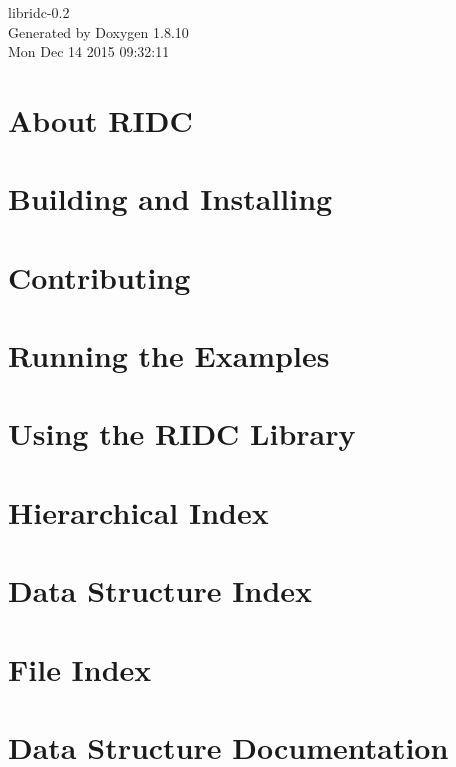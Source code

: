 \documentclass[twoside]{article}
\newcommand{\+}{\discretionary{\mbox{\scriptsize$\hookleftarrow$}}{}{}}
\begin{document}
\begin{titlepage}
\vspace*{7cm}
\begin{center}%
{\Large libridc-\/0.2 }\\
\vspace*{1cm}
{\large Generated by Doxygen 1.8.10}\\
\vspace*{0.5cm}
{\small Mon Dec 14 2015 09:32:11}\\
\end{center}
\end{titlepage}
\tableofcontents
{}

\section{About R\+I\+D\+C}
\label{md_README}

\section{Building and Installing}
\label{md_doc_source_0_installing}

\section{Contributing}
\label{page_contributing}

\section{Running the Examples}
\label{running}

\section{Using the R\+I\+D\+C Library}
\label{md_doc_source_3_use}

\section{Hierarchical Index}

\section{Data Structure Index}

\section{File Index}

\section{Data Structure Documentation}








\end{document}

